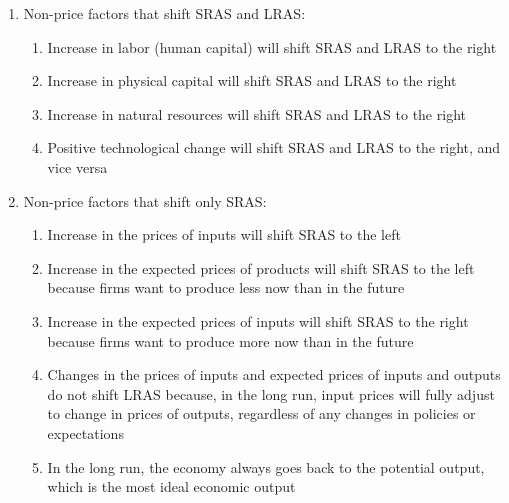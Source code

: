 \documentclass[12pt]{article}
\begin{document}
\begin{enumerate}
\begin{enumerate}
        \end{enumerate}

      \item Non-price factors that shift SRAS and LRAS:

        \begin{enumerate}

          \item Increase in labor (human capital) will shift SRAS and LRAS to the right

          \item Increase in physical capital will shift SRAS and LRAS to the right

          \item Increase in natural resources will shift SRAS and LRAS to the right

          \item Positive technological change will shift SRAS and LRAS to the right, and vice versa

        \end{enumerate}

      \item Non-price factors that shift only SRAS:

        \begin{enumerate}

          \item Increase in the prices of inputs will shift SRAS to the left

          \item Increase in the expected prices of products will shift SRAS to the left because firms want to produce less now than in the future

          \item Increase in the expected prices of inputs will shift SRAS to the right because firms want to produce more now than in the future

          \item Changes in the prices of inputs and expected prices of inputs and outputs do not shift LRAS because, in the long run, input prices will fully adjust to change in prices of outputs, regardless of any changes in policies or expectations

          \item In the long run, the economy always goes back to the potential output, which is the most ideal economic output

        \end{enumerate}


\end{enumerate}
\end{document}
